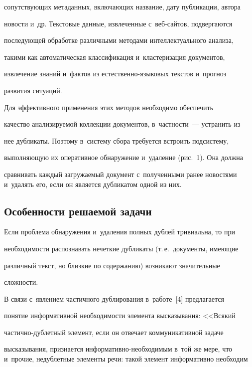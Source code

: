 сопутствующих метаданных, включающих название, дату публикации, автора

новости и~др. Текстовые данные, извлеченные с~веб-сай\-тов, подвергаются

последующей обработке различными методами интеллектуального анализа,

такими как автоматическая классификация и~кластеризация документов,

извлечение знаний и~фактов из ес\-те\-ст\-вен\-но-язы\-ко\-вых текстов и~прогноз

развития ситуаций.



  Для эффективного применения этих методов необходимо обеспечить

качество анализируемой коллекции документов, в~частности~--- устранить из

нее дубликаты. Поэтому в~систему сбора требуется встроить подсистему,

выполняющую их оперативное обнаружение и~удаление (рис.~1). Она должна

сравнивать каждый загружаемый документ с~полученными ранее новостями и~удалять его, если он является дубликатом одной из них.







\subsection{Особенности решаемой задачи}



  Если проблема обнаружения и~удаления полных дублей тривиальна, то при

необходимости распознавать нечеткие дубликаты (т.\,е.\ документы, имеющие

различный текст, но близкие по содержанию) возникают значительные

сложности.



  В связи с~явлением частичного дублирования в~работе~[4] предлагается

понятие информативной необходимости элемента высказывания: <<Всякий

час\-тич\-но-дуб\-лет\-ный элемент, если он отвечает коммуникативной задаче

высказывания, признается информативно-необходимым в~той же мере, что и~прочие, не\-дуб\-лет\-ные элементы речи: такой элемент информативно необходим

